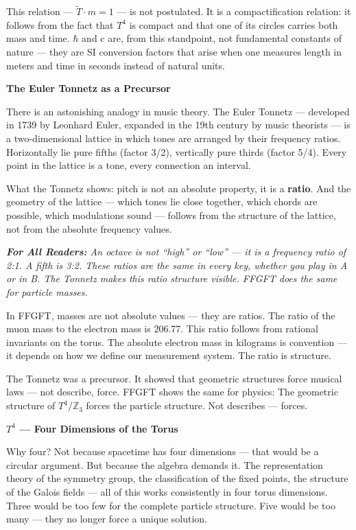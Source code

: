 \documentclass[11pt,oneside]{book}
\newenvironment{laierspur}{%
  \par\vspace{4pt}%
  \noindent\small\itshape\color{blue!60!black}%
  \textbf{For All Readers:}\enspace\ignorespaces}{%
  \par\vspace{4pt}\normalsize\normalfont\normalcolor}
\begin{document}
This relation — $\tilde{T}\cdot m = 1$ — is not postulated. It is a
compactification relation: it follows from the fact that $T^4$ is compact and
that one of its circles carries both mass and time. $\hbar$ and c are, from
this standpoint, not fundamental constants of nature — they are SI
conversion factors that arise when one measures length in meters and time in
seconds instead of natural units.

\textbf{The Euler Tonnetz as a Precursor}

There is an astonishing analogy in music theory. The Euler Tonnetz —
developed in 1739 by Leonhard Euler, expanded in the 19th century by music
theorists — is a two-dimensional lattice in which tones are arranged by
their frequency ratios. Horizontally lie pure fifths (factor 3/2), vertically
pure thirds (factor 5/4). Every point in the lattice is a tone, every
connection an interval.

What the Tonnetz shows: pitch is not an absolute property, it is a
\textbf{ratio}. And the geometry of the lattice — which tones lie close
together, which chords are possible, which modulations sound — follows from
the structure of the lattice, not from the absolute frequency values.

\begin{laierspur}
An octave is not \enquote{high} or \enquote{low} — it is a frequency ratio of 2:1. A
fifth is 3:2. These ratios are the same in every key, whether you play in A
or in B. The Tonnetz makes this ratio structure visible. FFGFT does the same
for particle masses.
\end{laierspur}

In FFGFT, masses are not absolute values — they are ratios. The ratio of the
muon mass to the electron mass is 206.77. This ratio follows from rational
invariants on the torus. The absolute electron mass in kilograms is
convention — it depends on how we define our measurement system. The ratio
is structure.

The Tonnetz was a precursor. It showed that geometric structures force
musical laws — not describe, force. FFGFT shows the same for physics: The
geometric structure of $T^4/\mathbb{Z}_3$ forces the particle structure. Not
describes — forces.

\textbf{$T^4$ — Four Dimensions of the Torus}

Why four? Not because spacetime has four dimensions — that would be a
circular argument. But because the algebra demands it. The representation
theory of the symmetry group, the classification of the fixed points, the
structure of the Galois fields — all of this works consistently in four
torus dimensions. Three would be too few for the complete particle
structure. Five would be too many — they no longer force a unique solution.
\end{document}
